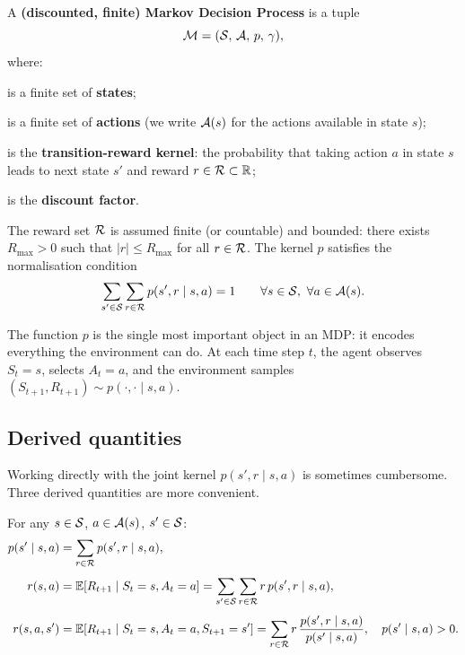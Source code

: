 \begin{definition}
\label{def:mdp}
A \textbf{(discounted, finite) Markov Decision Process} is a tuple
\begin{equation}
\label{eq:mdp-tuple}
\mathcal{M} = (\mathcal{S},\, \mathcal{A},\, p,\, \gamma),
\end{equation}
where:
\begin{description}[leftmargin=!,labelwidth=3.5cm]
  \item[$\cS$] is a finite set of \textbf{states};
  \item[$\cA$] is a finite set of \textbf{actions} (we write $\mathcal{A}(s)$ for the actions available in state $s$);
  \item[$p(s',r \mid s, a)$] is the \textbf{transition-reward kernel}: the probability that taking action $a$ in state $s$ leads to next state $s'$ and reward $r \in \mathcal{R} \subset \mathbb{R}$;
  \item[$\gamma \in [0, 1)$] is the \textbf{discount factor}.
\end{description}
The reward set $\mathcal{R}$ is assumed finite (or countable) and bounded: there exists $R_{\max} > 0$ such that $|r| \le R_{\max}$ for all $r \in \mathcal{R}$. The kernel $p$ satisfies the normalisation condition
\begin{equation}
\label{eq:normalisation}
\sum_{s' \in \mathcal{S}} \sum_{r \in \mathcal{R}} p(s', r \mid s, a) = 1
\qquad \forall s \in \mathcal{S},\ \forall a \in \mathcal{A}(s).
\end{equation}
\end{definition}

The function $p$ is the single most important object in an MDP: it encodes everything the environment can do. At each time step $t$, the agent observes $S_t = s$, selects $A_t = a$, and the environment samples $(S_{t+1}, R_{t+1}) \sim p(\cdot, \cdot \mid s, a)$.

\subsection*{Derived quantities}

Working directly with the joint kernel $p(s', r \mid s, a)$ is sometimes cumbersome. Three derived quantities are more convenient.

\begin{proposition}
\label{prop:derived}
For any $s \in \mathcal{S}$, $a \in \mathcal{A}(s)$, $s' \in \mathcal{S}$:
\begin{align}
p(s' \mid s, a) &= \sum_{r \in \mathcal{R}} p(s', r \mid s, a), \label{eq:state-tp} \\[4pt]
r(s, a) &= \operatorname{\mathbb{E}}[R_{t+1} \mid S_t = s, A_t = a]
           = \sum_{s' \in \mathcal{S}} \sum_{r \in \mathcal{R}} r\, p(s', r \mid s, a), \label{eq:exp-reward-sa} \\[4pt]
r(s, a, s') &= \operatorname{\mathbb{E}}[R_{t+1} \mid S_t = s, A_t = a, S_{t+1} = s']
              = \sum_{r \in \mathcal{R}} r\, \frac{p(s', r \mid s, a)}{p(s' \mid s, a)},
              \quad p(s' \mid s, a) > 0. \label{eq:exp-reward-sas}
\end{align}
\end{proposition}

